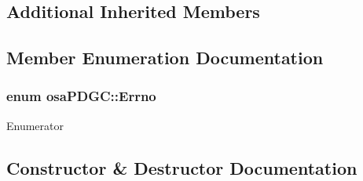 \subsection*{Additional Inherited Members}


\subsection{Member Enumeration Documentation}
\hypertarget{classosa_p_d_g_c_af906659affdf9f98d957a4942b37f441}{}
\subsubsection[{Errno}]{\setlength{\rightskip}{0pt plus 5cm}enum {\bf osa\+P\+D\+G\+C\+::\+Errno}}\label{classosa_p_d_g_c_af906659affdf9f98d957a4942b37f441}
\begin{Desc}
\item[Enumerator]\par
\begin{description}
\item[{\em 
\hypertarget{classosa_p_d_g_c_af906659affdf9f98d957a4942b37f441a6226106dbd9609d76bc73d8b7fb68c8e}{}E\+S\+U\+C\+C\+E\+S\+S\label{classosa_p_d_g_c_af906659affdf9f98d957a4942b37f441a6226106dbd9609d76bc73d8b7fb68c8e}
}]\item[{\em 
\hypertarget{classosa_p_d_g_c_af906659affdf9f98d957a4942b37f441a03d04c1de6a736fdc57e5de8c4b4da67}{}E\+F\+A\+I\+L\+U\+R\+E\label{classosa_p_d_g_c_af906659affdf9f98d957a4942b37f441a03d04c1de6a736fdc57e5de8c4b4da67}
}]\end{description}
\end{Desc}


\subsection{Constructor \& Destructor Documentation}
\hypertarget{classosa_p_d_g_c_a8b571b78f40d4c5e8a815f8a6f21a99d}{}
